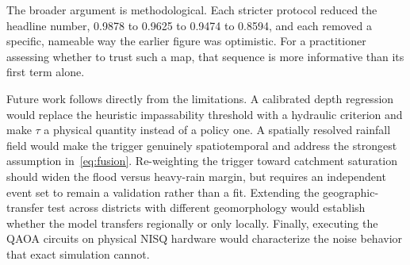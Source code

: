 \documentclass[10pt,twocolumn]{article}
\begin{document}
The broader argument is methodological. Each stricter protocol reduced the
headline number, 0.9878 to 0.9625 to 0.9474 to 0.8594, and each removed a specific,
nameable way the earlier figure was optimistic. For a practitioner assessing
whether to trust such a map, that sequence is more informative than its first term
alone.

Future work follows directly from the limitations. A calibrated depth regression
would replace the heuristic impassability threshold with a hydraulic criterion
and make $\tau$ a physical quantity instead of a policy one. A spatially
resolved rainfall field would make the trigger genuinely spatiotemporal and
address the strongest assumption in~\eqref{eq:fusion}. Re-weighting the
trigger toward catchment saturation should widen the flood versus heavy-rain
margin, but requires an independent event set to remain a validation rather than
a fit. Extending the geographic-transfer test across districts with different
geomorphology would establish whether the model transfers regionally or only
locally. Finally, executing the QAOA circuits on physical NISQ hardware would
characterize the noise behavior that exact simulation cannot.


\footnotesize
\end{document}

